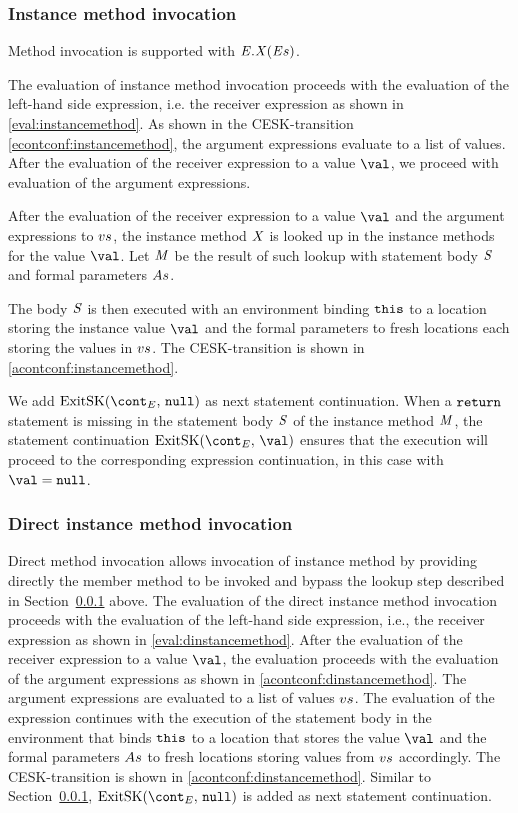 \documentclass[a4paper,oneside]{article}
\begin{document}
\subsubsection{Instance method invocation}
\label{subsubsec:instance-method-invoc}

Method invocation is supported with $\mathit{E}.\mathit{X}(\mathit{E}{s})$.

The evaluation of instance method invocation proceeds with the evaluation of the left-hand side expression, i.e. the receiver expression as shown in \eqref{eval:instancemethod}.
As shown in the CESK-transition \eqref{econtconf:instancemethod}, the argument expressions evaluate to a list of values.
After the evaluation of the receiver expression to a value $\val$, we proceed with evaluation of the argument expressions.

After the evaluation of the receiver expression to a value $\val$ and the argument expressions to $vs$, the instance method $\mathit{X}$ is looked up in the instance methods for the value $\val$.
Let $\mathit{M}$ be the result of such lookup with statement body $\mathit{S}$ and formal parameters $As$.

The body $\mathit{S}$ is then executed with an environment binding $\tt{this}$ to a location storing the instance value $\val$ and the formal parameters to fresh locations each storing the values in $vs$.
The CESK-transition is shown in \eqref{acontconf:instancemethod}.

We add $\ExitSK{\tt{null}}$ as next statement continuation.
When a $\tt{return}$ statement is missing in the statement body $\mathit{S}$ of the instance method $\mathit{M}$, the statement continuation $\ExitSK{\val}$ ensures that the execution will proceed to the corresponding expression continuation, in this case with $\val = \tt{null}$.


\subsubsection{Direct instance method invocation}
\label{subsubsec:direct-instance-method-invoc}

Direct method invocation allows invocation of instance method by providing directly the member method to be invoked and bypass the lookup step described in Section~\ref{subsubsec:instance-method-invoc} above.
The evaluation of the direct instance method invocation proceeds with the evaluation of the left-hand side expression, i.e., the receiver expression as shown in \eqref{eval:dinstancemethod}.
After the evaluation of the receiver expression to a value $\val$, the evaluation proceeds with the evaluation of the argument expressions as shown in \eqref{acontconf:dinstancemethod}.
The argument expressions are evaluated to a list of values $vs$.
The evaluation of the expression continues with the execution of the statement body in the environment that binds $\tt{this}$ to a location that stores the value $\val$ and the formal parameters $As$ to fresh locations storing values from $vs$ accordingly.
The CESK-transition is shown in \eqref{acontconf:dinstancemethod}.
Similar to Section~\ref{subsubsec:instance-method-invoc}, $\ExitSK{\tt{null}}$ is added as next statement continuation.
\end{document}
